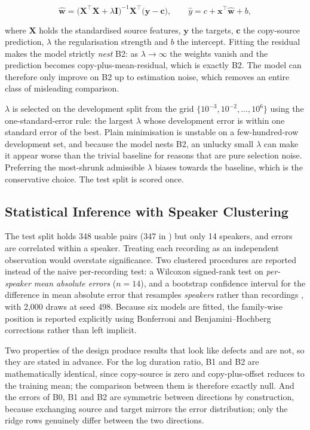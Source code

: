 \begin{equation}
\hat{\mathbf{w}} = \big(\mathbf{X}^{\!\top}\mathbf{X} + \lambda \mathbf{I}\big)^{-1}
                    \mathbf{X}^{\!\top}\big(\mathbf{y} - \mathbf{c}\big),
\qquad
\hat{y} = c + \mathbf{x}^{\!\top}\hat{\mathbf{w}} + b,
\label{eq:ridge}
\end{equation}

where $\mathbf{X}$ holds the standardised source features, $\mathbf{y}$ the targets, $\mathbf{c}$
the copy-source prediction, $\lambda$ the regularisation strength and $b$ the intercept. Fitting
the residual makes the model strictly \emph{nest} B2: as $\lambda \to \infty$ the weights vanish
and the prediction becomes copy-plus-mean-residual, which is exactly B2. The model can therefore
only improve on B2 up to estimation noise, which removes an entire class of misleading comparison.

$\lambda$ is selected on the development split from the grid
$\{10^{-3},10^{-2},\dots,10^{6}\}$ using the one-standard-error rule: the largest $\lambda$ whose
development error is within one standard error of the best. Plain minimisation is unstable on a
few-hundred-row development set, and because the model nests B2, an unlucky small $\lambda$ can
make it appear worse than the trivial baseline for reasons that are pure selection noise.
Preferring the most-shrunk admissible $\lambda$ biases towards the baseline, which is the
conservative choice. The test split is scored once.

\subsection{Statistical Inference with Speaker Clustering}
\label{sec:inference}
The test split holds 348 usable pairs (347 in \esto{}) but only 14 speakers, and errors are correlated
within a speaker. Treating each recording as an independent observation would overstate
significance. Two clustered procedures are reported instead of the naive per-recording test: a
Wilcoxon signed-rank test \cite{wilcoxon1945} on \emph{per-speaker mean absolute errors}
($n=14$), and a bootstrap confidence interval for the difference in mean absolute error that
resamples \emph{speakers} rather than recordings \cite{efron1993bootstrap}, with 2{,}000 draws at
seed 498. Because six models are fitted, the family-wise position is reported explicitly using
Bonferroni and Benjamini--Hochberg \cite{benjamini1995fdr} corrections rather than left implicit.

Two properties of the design produce results that look like defects and are not, so they are
stated in advance. For the log duration ratio, B1 and B2 are mathematically identical, since
copy-source is zero and copy-plus-offset reduces to the training mean; the comparison between them
is therefore exactly null. And the errors of B0, B1 and B2 are symmetric between directions by
construction, because exchanging source and target mirrors the error distribution; only the ridge
rows genuinely differ between the two directions.


